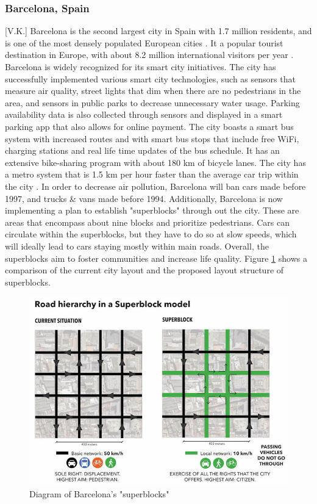 \documentclass[12pt]{article}                       %
\begin{document}
\subsubsection{Barcelona, Spain}[V.K.]
Barcelona is the second largest city in Spain with 1.7 million residents, and is one of the most densely populated European cities \cite{Bausells2016SuperblocksResidents}. It a popular tourist destination in Europe, with about 8.2 million international visitors per year \cite{Bausells2016SuperblocksResidents}. Barcelona is widely recognized for its smart city initiatives. The city has successfully implemented various smart city technologies, such as sensors that measure air quality, street lights that dim when there are no pedestrians in the area, and sensors in public parks to decrease unnecessary water usage. Parking availability data is also collected through sensors and displayed in a smart parking app that also allows for online payment. The city boasts a smart bus system with increased routes and with smart bus stops that include free WiFi, charging stations and real life time updates of the bus schedule. It has an extensive bike-sharing program with about 180 km of bicycle lanes. The city has a metro system that is 1.5 km per hour faster than the average car trip within the city \cite{Bausells2016SuperblocksResidents}. In order to decrease air pollution, Barcelona will ban cars made before 1997, and trucks \& vans made before 1994. Additionally, Barcelona is now implementing a plan to establish "superblocks" through out the city. These are areas that encompass about nine blocks and prioritize pedestrians. Cars can circulate within the superblocks, but they have to do so at slow speeds, which will ideally lead to cars staying mostly within main roads. Overall, the superblocks aim to foster communities and increase life quality. Figure \ref{img:barcelona_superblock} shows a comparison of the current city layout and the proposed layout structure of superblocks.

\begin{figure}[H]
    \centering
    \includegraphics[scale=4.5]{images/barcelona_superblock.jpg}
    \caption{Diagram of Barcelona's "superblocks"}
    \label{img:barcelona_superblock}
\end{figure}
\end{document}
